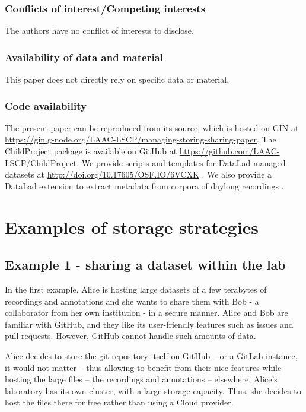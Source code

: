 \documentclass[smallextended]{svjour3}       %
\begin{document}
\subsubsection*{Conflicts of interest/Competing interests}

The authors have no conflict of interests to disclose.

\subsubsection*{Availability of data and material}

This paper does not directly rely on specific data or material.

\subsubsection*{Code availability}

The present paper can be reproduced from its source, which is hosted on GIN at \url{https://gin.g-node.org/LAAC-LSCP/managing-storing-sharing-paper}.
The ChildProject package is available on GitHub at \url{https://github.com/LAAC-LSCP/ChildProject}. We provide scripts and templates for DataLad managed datasets at \url{http://doi.org/10.17605/OSF.IO/6VCXK} \citep{datalad_procedures}. We also provide a DataLad extension to extract metadata from corpora of daylong recordings \citep{datalad_extension}.

\appendix

\section{Examples of storage strategies}\label{appendix:examples}

\subsection{\label{sec:example1}Example 1 - sharing a dataset within the lab}

In the first example, Alice is hosting large datasets of a few terabytes of recordings and annotations and she wants to share them with Bob - a collaborator from her own institution - in a secure manner. Alice and Bob are familiar with GitHub, and they like its user-friendly features such as issues and pull requests. However, GitHub cannot handle such amounts of data.

Alice decides to store the git repository itself on GitHub -- or a GitLab instance, it would not matter -- thus allowing to benefit from their nice features while hosting the large files -- the recordings and annotations -- elsewhere. Alice's laboratory has its own cluster, with a large storage capacity. Thus, she decides to host the files there for free rather than using a Cloud provider.
\end{document}
